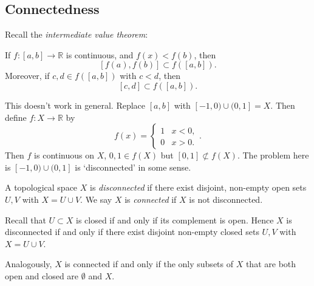 \documentclass[12pt]{article}
\begin{document}
\subsection{Connectedness}%
\label{sub:connectedness}

Recall the \textit{intermediate value theorem}:
\begin{center}
	If $f : [a, b] \to \mathbb{R}$ is continuous, and $f(x) < f(b)$, then
	\[
		[f(a), f(b)] \subset f([a, b])
	.\]
	Moreover, if $c, d \in f([a, b])$ with $c < d$, then
	\[
		[c, d] \subset f([a, b])
	.\]
\end{center}

This doesn't work in general. Replace $[a, b]$ with $[-1, 0) \cup (0, 1] = X$. Then define $f : X \to \mathbb{R}$ by
\[
	f(x) = 
	\begin{cases}
		1 & x < 0, \\
		0 & x > 0.
	\end{cases}	
.\]
Then $f$ is continuous on $X$, $0, 1 \in f(X)$ but $[0, 1] \not \subset f(X)$. The problem here is $[-1, 0) \cup (0, 1]$ is `disconnected' in some sense.

\begin{definition}
	A topological space $X$ is \textit{disconnected} if there exist disjoint, non-empty open sets $U, V$ with $X = U \cup V$. We say $X$ is \textit{connected} if $X$ is not disconnected.
\end{definition}

\begin{remark}
	Recall that $U \subset X$ is closed if and only if its complement is open. Hence $X$ is disconnected if and only if there exist disjoint non-empty closed sets $U, V$ with $X = U \cup V$.

	Analogously, $X$ is connected if and only if the only subsets of $X$ that are both open and closed are $\emptyset$ and $X$.
\end{remark}


\newpage

\printindex
\end{document}
